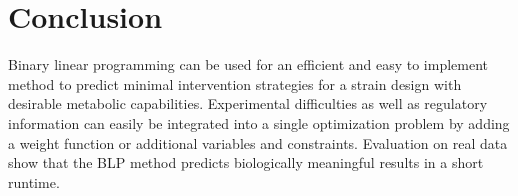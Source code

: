 \documentclass{llncs}
\begin{document}
\section{Conclusion}
Binary linear programming can be used for an efficient and easy to implement
method to predict minimal intervention strategies for a strain design
with desirable metabolic capabilities. 
Experimental difficulties as well as regulatory information can easily be
integrated into a single optimization problem by adding a weight function or 
additional variables and constraints.
Evaluation on real data show that the BLP method predicts biologically
meaningful results in a short runtime.

\end{document}
